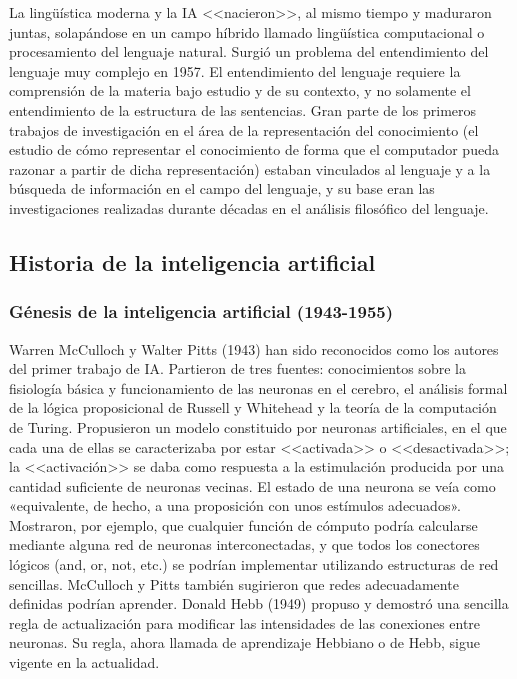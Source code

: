 \documentclass{article}
\begin{document}
La lingüística moderna y la IA <<nacieron>>, al mismo tiempo y maduraron juntas, solapándose en un campo híbrido llamado lingüística computacional o procesamiento del lenguaje natural. Surgió un problema del entendimiento del lenguaje muy complejo en 1957. El entendimiento del lenguaje requiere la comprensión de la materia bajo estudio y de su contexto, y no solamente el entendimiento de la estructura de las sentencias. Gran parte de los primeros trabajos de investigación en el área de la representación del conocimiento (el estudio de cómo representar el conocimiento de forma que el computador pueda razonar a partir de dicha representación) estaban vinculados al lenguaje y a la búsqueda de información en el campo del lenguaje, y su base eran las investigaciones realizadas durante décadas en el análisis filosófico del lenguaje.


\subsection{Historia de la inteligencia artificial}

\subsubsection{Génesis de la inteligencia artificial (1943-1955)}

Warren McCulloch y Walter Pitts (1943) han sido reconocidos como los autores del primer trabajo de IA. Partieron de tres fuentes: conocimientos sobre la fisiología básica y funcionamiento de las neuronas en el cerebro, el análisis formal de la lógica proposicional de Russell y Whitehead y la teoría de la computación de Turing. Propusieron un modelo constituido por neuronas artificiales, en el que cada una de ellas se caracterizaba por estar <<activada>> o <<desactivada>>; la <<activación>> se daba como respuesta a la estimulación producida por una cantidad suficiente de neuronas vecinas. El estado de una neurona se veía como «equivalente, de hecho, a una proposición con unos estímulos adecuados». Mostraron, por ejemplo, que cualquier función de cómputo podría calcularse mediante alguna red de neuronas interconectadas, y que todos los conectores lógicos (and, or, not, etc.) se podrían implementar utilizando estructuras de red sencillas. McCulloch y Pitts también sugirieron que redes adecuadamente definidas podrían aprender. Donald Hebb (1949) propuso y demostró una sencilla regla de actualización para modificar las intensidades de las conexiones entre neuronas. Su regla, ahora llamada de aprendizaje Hebbiano o de Hebb, sigue vigente en la actualidad. 
\end{document}
